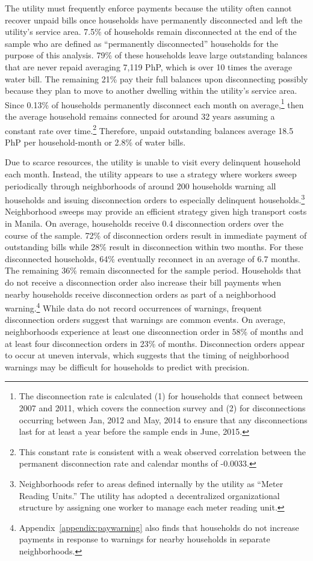 \documentclass[12pt]{article}
\begin{document}
The utility must frequently enforce payments because the utility often cannot recover unpaid bills once households have permanently disconnected and left the utility's service area.  7.5\% of households remain disconnected at the end of the sample who are defined as ``permanently disconnected'' households for the purpose of this analysis.  79\unskip\% of these households leave large outstanding balances that are never repaid averaging 7,119 PhP, which is over 10 times the average water bill.  The remaining 21\unskip\% pay their full balances upon disconnecting possibly because they plan to move to another dwelling within the utility's service area.  Since 0.13\% of households permanently disconnect each month on average,\footnote{The disconnection rate is calculated (1) for households that connect between 2007 and 2011, which covers the connection survey and (2) for disconnections occurring between Jan, 2012 and May, 2014 to ensure that any disconnections last for at least a year before the sample ends in June, 2015.} then the average household remains connected for around 32 years assuming a constant rate over time.\footnote{This constant rate is consistent with a weak observed correlation between the permanent disconnection rate and calendar months of -0.0033.}  Therefore, unpaid outstanding balances average 18.5 PhP per household-month or 2.8\% of water bills.

Due to scarce resources, the utility is unable to visit every delinquent household each month.  Instead, the utility appears to use a strategy where workers sweep periodically through neighborhoods of around 200 households warning all households and issuing disconnection orders to especially delinquent households.\footnote{Neighborhoods refer to areas defined internally by the utility as ``Meter Reading Units.''  The utility has adopted a decentralized organizational structure by assigning one worker to manage each meter reading unit.}  Neighborhood sweeps may provide an efficient strategy given high transport costs in Manila.  On average, households receive 0.4 disconnection orders over the course of the sample.  72\% of disconnection orders result in immediate payment of outstanding bills while 28\% result in disconnection within two months.  For these disconnected households, 64\% eventually reconnect in an average of 6.7 months.  The remaining 36\% remain disconnected for the sample period.   Households that do not receive a disconnection order also increase their bill payments when nearby households receive disconnection orders as part of a neighborhood warning.\footnote{Appendix~\ref{appendix:paywarning} also finds that households do not increase payments in response to warnings for nearby households in separate neighborhoods.}  While data do not record occurrences of warnings, frequent disconnection orders suggest that warnings are common events.  On average, neighborhoods experience at least one disconnection order in 58\unskip\% of months and at least four disconnection orders in 23\unskip\% of months.  Disconnection orders appear to occur at uneven intervals, which suggests that the timing of neighborhood warnings may be difficult for households to predict with precision.
\end{document}
